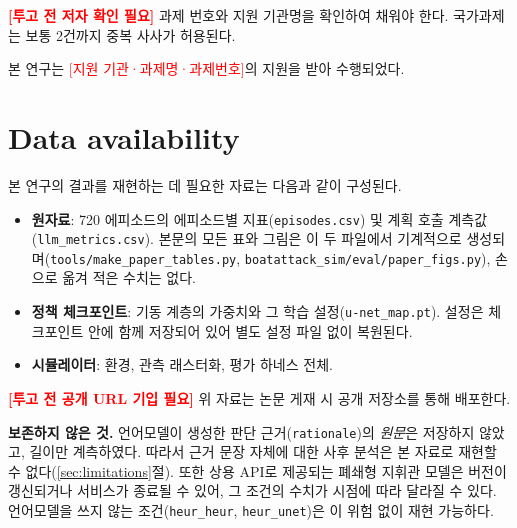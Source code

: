 \textcolor{red}{\textbf{[투고 전 저자 확인 필요]}} 과제 번호와 지원 기관명을 확인하여
채워야 한다. 국가과제는 보통 2건까지 중복 사사가 허용된다.

본 연구는 \textcolor{red}{[지원 기관·과제명·과제번호]}의 지원을 받아 수행되었다.

\section*{Data availability}

본 연구의 결과를 재현하는 데 필요한 자료는 다음과 같이 구성된다.

\begin{itemize}[leftmargin=*, itemsep=2pt, topsep=3pt]
\item \textbf{원자료}: 720 에피소드의 에피소드별 지표(\texttt{episodes.csv}) 및 계획 호출
      계측값(\texttt{llm\_metrics.csv}). 본문의 모든 표와 그림은 이 두 파일에서
      기계적으로 생성되며(\texttt{tools/make\_paper\_tables.py},
      \texttt{boatattack\_sim/eval/paper\_figs.py}), 손으로 옮겨 적은 수치는 없다.
\item \textbf{정책 체크포인트}: 기동 계층의 가중치와 그 학습 설정(\texttt{u-net\_map.pt}).
      설정은 체크포인트 안에 함께 저장되어 있어 별도 설정 파일 없이 복원된다.
\item \textbf{시뮬레이터}: 환경, 관측 래스터화, 평가 하네스 전체.
\end{itemize}

\noindent
\textcolor{red}{\textbf{[투고 전 공개 URL 기입 필요]}} 위 자료는 논문 게재 시
공개 저장소를 통해 배포한다.

\vspace{3pt}
\noindent
\textbf{보존하지 않은 것.} 언어모델이 생성한 판단 근거(\texttt{rationale})의 \emph{원문}은
저장하지 않았고, 길이만 계측하였다. 따라서 근거 문장 자체에 대한 사후 분석은 본 자료로
재현할 수 없다(\ref{sec:limitations}절). 또한 상용 API로 제공되는 폐쇄형 지휘관 모델은
버전이 갱신되거나 서비스가 종료될 수 있어, 그 조건의 수치가 시점에 따라 달라질 수 있다.
언어모델을 쓰지 않는 조건(\texttt{heur\_heur}, \texttt{heur\_unet})은 이 위험 없이
재현 가능하다.

